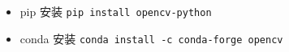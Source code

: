 
\begin{issues}
\issueDraft
\end{issues}

\begin{itemize}
\item pip 安装 \verb`pip install opencv-python`
\item conda 安装 \verb`conda install -c conda-forge opencv`
\end{itemize}
